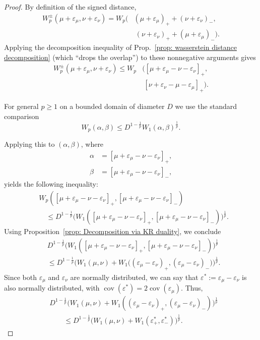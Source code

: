 \documentclass{article}
\theoremstyle{plain}
\theoremstyle{definition}
\theoremstyle{remark}
\begin{document}
\begin{proof}
By definition of the signed distance,
\begin{align}
W_p^\pm(\mu+\varepsilon_\mu,\nu+\varepsilon_\nu)
= W_p\big(&(\mu{+}\varepsilon_\mu)_+ + (\nu{+}\varepsilon_\nu)_-,\\&\ (\nu{+}\varepsilon_\nu)_+ + (\mu{+}\varepsilon_\mu)_-\big). \nonumber
\end{align}
Applying the decomposition inequality  of Prop.~\ref{prop: wasserstein distance decomposition} (which “drops the overlap”) to these nonnegative arguments gives
\begin{align}
W_p^\pm(\mu+\varepsilon_\mu,\nu+\varepsilon_\nu)
\le W_p&\big([\mu{+}\varepsilon_\mu{-}\nu{-}\varepsilon_\nu]_+,\\&\ [\nu{+}\varepsilon_\nu{-}\mu{-}\varepsilon_\mu]_+\big). \nonumber
\end{align}

For general $p\ge1$ on a bounded domain of diameter $D$ we use the standard comparison
\begin{equation}
    W_p(\alpha,\beta)\le D^{1-\frac1p}W_1(\alpha,\beta)^{\frac1p}.
\end{equation}

Applying this to $(\alpha,\beta)$, where
\begin{align}
    \alpha &= [\mu + \varepsilon_\mu - \nu - \varepsilon_\nu]_+, \\
    \beta  &= [\mu + \varepsilon_\mu - \nu - \varepsilon_\nu]_-, \nonumber
\end{align}
yields the following inequality:
\begin{align}
    &W_p([\mu{+}\varepsilon_\mu{-}\nu{-}\varepsilon_\nu]_+, [\mu{+}\varepsilon_\mu{-}\nu{-}\varepsilon_\nu]_-)
    \\&\quad\le 
    D^{1-\frac1p}\big(W_1([\mu{+}\varepsilon_\mu{-}\nu{-}\varepsilon_\nu]_+, [\mu{+}\varepsilon_\mu{-}\nu{-}\varepsilon_\nu]_-)\big)^{\frac1p}.     \nonumber
\end{align}
Using Proposition~\ref{prop: Decomposition via KR duality}, we conclude
\begin{align}
   & D^{1-\frac1p}\big(W_1([\mu{+}\varepsilon_\mu{-}\nu{-}\varepsilon_\nu]_+, 
        [\mu{+}\varepsilon_\mu{-}\nu{-}\varepsilon_\nu]_-)\big)^{\frac1p} \\
   &\le D^{1-\frac1p}\big(W_1(\mu,\nu)+W_1\big((\varepsilon_\mu-\varepsilon_\nu)_+,
        (\varepsilon_\mu-\varepsilon_\nu)_-\big)\big)^{\frac1p}. \nonumber
\end{align}
Since both $\varepsilon_\mu$ and $\varepsilon_\nu$ are normally distributed, we can say that $\varepsilon^*:=\varepsilon_\mu-\varepsilon_\nu$ is also normally distributed, with $\operatorname{cov}(\varepsilon^*) = 2 \operatorname{cov}(\varepsilon_\mu)$. Thus,
\begin{align}
    &D^{1-\frac1p}\big(W_1(\mu,\nu)+W_1((\varepsilon_\mu-\varepsilon_\nu)_+,(\varepsilon_\mu-\varepsilon_\nu)_-)\big)^{\frac1p} \nonumber
    \\
    &\qquad\le D^{1-\frac1p}\big(W_1(\mu,\nu)+W_1(\varepsilon^*_+,\varepsilon^*_-)\big)^{\frac1p}.
\end{align}
\end{proof}
\end{document}
